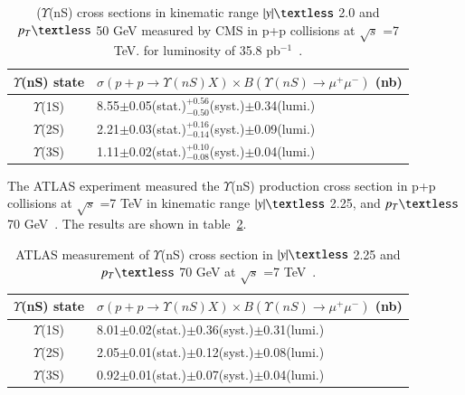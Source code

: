 \begin{table}
  \begin{center}
    \caption[]{ ($\Upsilon$(nS) cross sections
  in kinematic range $|y|\textless$ 2.0 and $p_{T}\textless$ 50 GeV 
      measured by CMS in p+p collisions at $\surd s$ =7 TeV.
  for luminosity of 35.8 pb$^{-1}$~\cite{CMS:2015xqv}.}
\label{Tab:CMSYCrossPLB}
\begin{tabular}{cl} 
\hline 
\hline
$\Upsilon$(nS) state             &$ \sigma(p+p \rightarrow \Upsilon(nS)X) \times B(\Upsilon(nS)\rightarrow\mu^{+}\mu^{-})$ (nb)    \\              
\hline
$\Upsilon$(1S)                   &8.55$\pm$0.05(stat.)$^{+0.56}_{-0.50}$(syst.)$\pm$0.34(lumi.)\\
$\Upsilon$(2S)                   &2.21$\pm$0.03(stat.)$^{+0.16}_{-0.14}$(syst.)$\pm$0.09(lumi.)\\
$\Upsilon$(3S)                   &1.11$\pm$0.02(stat.)$^{+0.10}_{-0.08}$(syst.)$\pm$0.04(lumi.)\\
\hline
\hline
\end{tabular}
\end{center}
\end{table}


The ATLAS experiment measured the $\Upsilon$(nS) production cross section
in p+p collisions at $\surd s$ =7 TeV in kinematic range $|y|\textless$ 2.25,
and $p_{T}\textless$ 70 GeV~\cite{ATLAS:2012lmu}.  
The results are shown in table~\ref{Tab:ATLASYCross}.


\begin{table}
  \begin{center}
    \caption[]{ATLAS measurement of $\Upsilon$(nS) cross section in $|y|\textless$ 2.25 and $p_{T}\textless$ 70 GeV
      at $\surd s$ =7 TeV~\cite{ATLAS:2012lmu}.}
\label{Tab:ATLASYCross}
\begin{tabular}{cl} 
\hline 
\hline
$\Upsilon$(nS) state             &$ \sigma(p+p \rightarrow \Upsilon(nS)X) \times B(\Upsilon(nS)\rightarrow\mu^{+}\mu^{-})$ (nb)    \\              
\hline
$\Upsilon$(1S)                   &8.01$\pm$0.02(stat.)$\pm$0.36(syst.)$\pm$0.31(lumi.)\\
$\Upsilon$(2S)                   &2.05$\pm$0.01(stat.)$\pm$0.12(syst.)$\pm$0.08(lumi.)\\
$\Upsilon$(3S)                   &0.92$\pm$0.01(stat.)$\pm$0.07(syst.)$\pm$0.04(lumi.)\\
\hline
\hline
\end{tabular}
\end{center}
\end{table}

